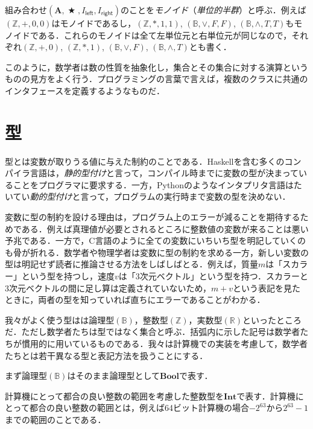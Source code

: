 \documentclass[twocolumn]{jsbook}
\newcommand{\programminglanguage}[1]{\textsf{#1}}
\newcommand{\clang}{\programminglanguage{C}}
\newcommand{\haskell}{\programminglanguage{Haskell}}
\newcommand{\python}{\programminglanguage{Python}}
\newcommand{\keyword}[1]{{\emph{#1}}}
\newcommand{\hsklType}[1]{\textbf{#1}}
\newcommand{\hsklBool}{\hsklType{Bool}}
\newcommand{\hsklInt}{\hsklType{Int}}
\newcommand{\mathVarKeyword}[1]{\mathsf{#1}}
\DeclareMathOperator{\mathAnyBinaryOperator}{\bigstar}
\newcommand{\mathLeft}{\mathVarKeyword{left}}
\newcommand{\mathRight}{\mathVarKeyword{right}}
\newcommand{\mathSet}[1]{\mathbf{#1}} %
\newcommand{\mathSpecialSet}[1]{\mathbb{#1}} %
\begin{document}
組み合わせ$(\mathSet{A},\mathAnyBinaryOperator,I_\mathLeft,I_\mathRight)$のことを\keyword{モノイド}（\keyword{単位的半群}）と呼ぶ．例えば$(\mathSpecialSet{Z},+,0,0)$はモノイドであるし，$(\mathSpecialSet{Z},*,1,1)$, $(\mathSpecialSet{B},\vee,F,F)$, $(\mathSpecialSet{B},\wedge,T,T)$もモノイドである．これらのモノイドは全て左単位元と右単位元が同じなので，それぞれ$(\mathSpecialSet{Z},+,0)$, $(\mathSpecialSet{Z},*,1)$, $(\mathSpecialSet{B},\vee,F)$, $(\mathSpecialSet{B},\wedge,T)$とも書く．

このように，数学者は数の性質を抽象化し，集合とその集合に対する演算というものの見方をよく行う．プログラミングの言葉で言えば，複数のクラスに共通のインタフェースを定義するようなものだ．

\section{型}

型とは変数が取りうる値に与えた制約のことである．\haskell を含む多くのコンパイラ言語は，\keyword{静的型付け}と言って，コンパイル時までに変数の型が決まっていることをプログラマに要求する．一方，\python のようなインタプリタ言語はたいてい\keyword{動的型付け}と言って，プログラムの実行時まで変数の型を決めない．

変数に型の制約を設ける理由は，プログラム上のエラーが減ることを期待するためである．例えば真理値が必要とされるところに整数値の変数が来ることは悪い予兆である．一方で，\clang 言語のように全ての変数にいちいち型を明記していくのも骨が折れる．数学者や物理学者は変数に型の制約を求める一方，新しい変数の型は明記せず読者に推論させる方法をしばしばとる．例えば，質量$m$は「スカラー」という型を持つし，速度$v$は「3次元ベクトル」という型を持つ．スカラーと3次元ベクトルの間に足し算は定義されていないため，$m+v$という表記を見たときに，両者の型を知っていれば直ちにエラーであることがわかる．

我々がよく使う型はは論理型$(\mathSpecialSet{B})$，整数型$(\mathSpecialSet{Z})$，実数型$(\mathSpecialSet{R})$といったところだ．ただし数学者たちは型ではなく集合と呼ぶ．括弧内に示した記号は数学者たちが慣用的に用いているものである．我々は計算機での実装を考慮して，数学者たちとは若干異なる型と表記方法を扱うことにする．

まず論理型$(\mathSpecialSet{B})$はそのまま論理型として$\hsklBool$で表す．

計算機にとって都合の良い整数の範囲を考慮した整数型を$\hsklInt$で表す．計算機にとって都合の良い整数の範囲とは，例えば64ビット計算機の場合$-2^{63}$から$2^{63}-1$までの範囲のことである．
\end{document}

